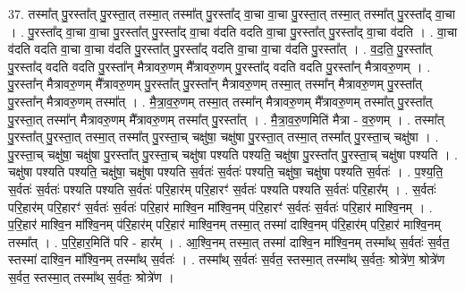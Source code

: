 \documentclass[17pt]{extarticle}
\begin{document}
37. तस्मा᳚त् पु॒रस्ता᳚त् पु॒रस्ता॒त् तस्मा॒त् तस्मा᳚त् पु॒रस्ता᳚द् वा॒चा वा॒चा पु॒रस्ता॒त् तस्मा॒त् तस्मा᳚त् पु॒रस्ता᳚द् वा॒चा । . पु॒रस्ता᳚द् वा॒चा वा॒चा पु॒रस्ता᳚त् पु॒रस्ता᳚द् वा॒चा व॑दति वदति वा॒चा पु॒रस्ता᳚त् पु॒रस्ता᳚द् वा॒चा व॑दति । . वा॒चा व॑दति वदति वा॒चा वा॒चा व॑दति पु॒रस्ता᳚त् पु॒रस्ता᳚द् वदति वा॒चा वा॒चा व॑दति पु॒रस्ता᳚त् । . व॒द॒ति॒ पु॒रस्ता᳚त् पु॒रस्ता᳚द् वदति वदति पु॒रस्ता᳚न् मैत्रावरु॒णम् मै᳚त्रावरु॒णम् पु॒रस्ता᳚द् वदति वदति पु॒रस्ता᳚न् मैत्रावरु॒णम् । . पु॒रस्ता᳚न् मैत्रावरु॒णम् मै᳚त्रावरु॒णम् पु॒रस्ता᳚त् पु॒रस्ता᳚न् मैत्रावरु॒णम् तस्मा॒त् तस्मा᳚न् मैत्रावरु॒णम् पु॒रस्ता᳚त् पु॒रस्ता᳚न् मैत्रावरु॒णम् तस्मा᳚त् । . मै॒त्रा॒व॒रु॒णम् तस्मा॒त् तस्मा᳚न् मैत्रावरु॒णम् मै᳚त्रावरु॒णम् तस्मा᳚त् पु॒रस्ता᳚त् पु॒रस्ता॒त् तस्मा᳚न् मैत्रावरु॒णम् मै᳚त्रावरु॒णम् तस्मा᳚त् पु॒रस्ता᳚त् । . मै॒त्रा॒व॒रु॒णमिति॑ मैत्रा - व॒रु॒णम् । . तस्मा᳚त् पु॒रस्ता᳚त् पु॒रस्ता॒त् तस्मा॒त् तस्मा᳚त् पु॒रस्ता॒च् चक्षु॑षा॒ चक्षु॑षा पु॒रस्ता॒त् तस्मा॒त् तस्मा᳚त् पु॒रस्ता॒च् चक्षु॑षा । . पु॒रस्ता॒च् चक्षु॑षा॒ चक्षु॑षा पु॒रस्ता᳚त् पु॒रस्ता॒च् चक्षु॑षा पश्यति पश्यति॒ चक्षु॑षा पु॒रस्ता᳚त् पु॒रस्ता॒च् चक्षु॑षा पश्यति । . चक्षु॑षा पश्यति पश्यति॒ चक्षु॑षा॒ चक्षु॑षा पश्यति स॒र्वतः॑ स॒र्वतः॑ पश्यति॒ चक्षु॑षा॒ चक्षु॑षा पश्यति स॒र्वतः॑ । . प॒श्य॒ति॒ स॒र्वतः॑ स॒र्वतः॑ पश्यति पश्यति स॒र्वतः॑ परि॒हार॑म् परि॒हारꣳ॑ स॒र्वतः॑ पश्यति पश्यति स॒र्वतः॑ परि॒हार᳚म् । . स॒र्वतः॑ परि॒हार॑म् परि॒हारꣳ॑ स॒र्वतः॑ स॒र्वतः॑ परि॒हार॑ माश्वि॒न मा᳚श्वि॒नम् प॑रि॒हारꣳ॑ स॒र्वतः॑ स॒र्वतः॑ परि॒हार॑ माश्वि॒नम् । . प॒रि॒हार॑ माश्वि॒न मा᳚श्वि॒नम् प॑रि॒हार॑म् परि॒हार॑ माश्वि॒नम् तस्मा॒त् तस्मा॑ दाश्वि॒नम् प॑रि॒हार॑म् परि॒हार॑ माश्वि॒नम् तस्मा᳚त् । . प॒रि॒हार॒मिति॑ परि - हार᳚म् । . आ॒श्वि॒नम् तस्मा॒त् तस्मा॑ दाश्वि॒न मा᳚श्वि॒नम् तस्मा᳚थ् स॒र्वतः॑ स॒र्वत॒ स्तस्मा॑ दाश्वि॒न मा᳚श्वि॒नम् तस्मा᳚थ् स॒र्वतः॑ । . तस्मा᳚थ् स॒र्वतः॑ स॒र्वत॒ स्तस्मा॒त् तस्मा᳚थ् स॒र्वतः॒ श्रोत्रे॑ण॒ श्रोत्रे॑ण स॒र्वत॒ स्तस्मा॒त् तस्मा᳚थ् स॒र्वतः॒ श्रोत्रे॑ण । \newline
\end{document}
